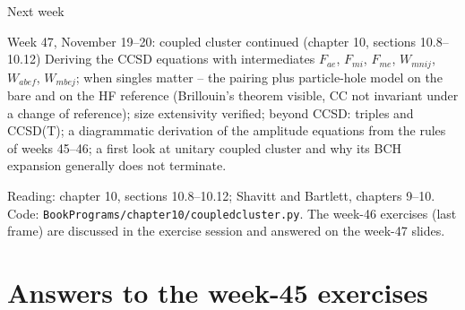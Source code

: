 \documentclass[aspectratio=169,10pt]{beamer}
\begin{document}
\begin{frame}{Next week}
  \begin{exampleblock}{Week 47, November 19--20: coupled cluster continued (chapter 10, sections 10.8--10.12)}
    \small
    Deriving the CCSD equations with intermediates $F_{ae}$, $F_{mi}$, $F_{me}$, $W_{mnij}$, $W_{abef}$, $W_{mbej}$; when singles matter -- the pairing plus particle-hole model on the bare and on the HF reference (Brillouin's theorem visible, CC not invariant under a change of reference); size extensivity verified; beyond CCSD: triples and CCSD(T); a diagrammatic derivation of the amplitude equations from the rules of weeks 45--46; a first look at unitary coupled cluster and why its BCH expansion generally does not terminate.
  \end{exampleblock}
  \vspace{0.5em}
  \small
  Reading: chapter 10, sections 10.8--10.12; Shavitt and Bartlett, chapters 9--10. Code: \texttt{BookPrograms/chapter10/coupledcluster.py}. The week-46 exercises (last frame) are discussed in the exercise session and answered on the week-47 slides.
\end{frame}

\section{Answers to the week-45 exercises}
\end{document}
